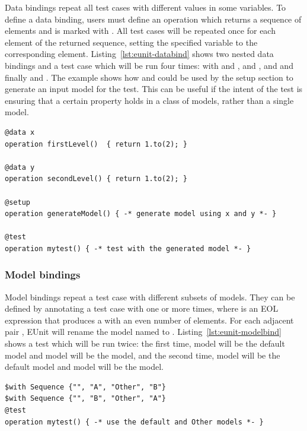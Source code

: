 Data bindings repeat all test cases with different values in some variables. To define a data binding, users must define an operation which returns a sequence of elements and is marked with . All test cases will be repeated once for each element of the returned sequence, setting the specified variable to the corresponding element. Listing~\ref{lst:eunit-databind} shows two nested data bindings and a test case which will be run four times: with  and ,  and ,  and  and finally  and . The example shows how  and  could be used by the setup section to generate an input model for the test. This can be useful if the intent of the test is ensuring that a certain property holds in a class of models, rather than a single model.

\begin{lstlisting}[language=EOL,caption=Example of a 2-level data binding,label=lst:eunit-databind,columns=fixed,float]
@data x
operation firstLevel()  { return 1.to(2); }

@data y
operation secondLevel() { return 1.to(2); }

@setup
operation generateModel() { -* generate model using x and y *- }

@test
operation mytest() { -* test with the generated model *- }
\end{lstlisting}

\subsubsection{Model bindings}

Model bindings repeat a test case with different subsets of models. They can be defined by annotating a test case with  one or more times, where  is an EOL expression that produces a  with an even number of elements. For each adjacent pair , EUnit will rename the model named  to . Listing~\ref{lst:eunit-modelbind} shows a test which will be run twice: the first time, model  will be the default model and model  will be the  model, and the second time, model  will be the default model and model  will be the  model.

\begin{lstlisting}[language=EOL,caption=Example of a model binding,label=lst:eunit-modelbind,columns=fixed,float]
$with Sequence {"", "A", "Other", "B"}
$with Sequence {"", "B", "Other", "A"}
@test
operation mytest() { -* use the default and Other models *- }
\end{lstlisting}


